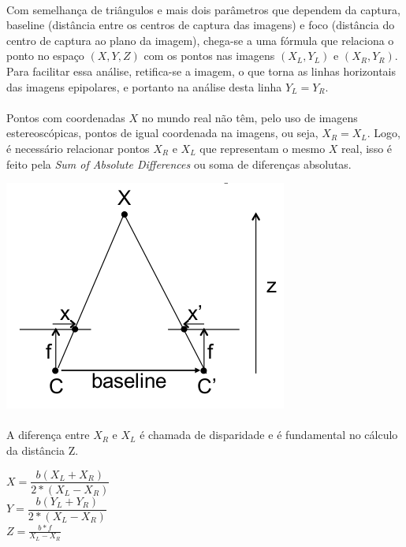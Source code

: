 \documentclass[conference, harvard, brazil, english]{sbatex}
\begin{document}
	\paragraph{} 
		Com semelhança de triângulos e mais dois parâmetros que dependem da captura, baseline (distância entre os centros de captura das imagens) e foco (distância do centro de captura ao plano da imagem), chega-se a uma fórmula que relaciona o ponto no espaço $ (X,Y,Z) $ com os pontos nas imagens $ (X_{L},Y_{L}) $ e $ (X_{R},Y_{R}) $. Para facilitar essa análise, retifica-se a imagem, o que torna as linhas horizontais das imagens epipolares, e portanto na análise desta linha $Y_{L} = Y_{R}$. 
	\paragraph{}
		Pontos com coordenadas $ X $ no mundo real não têm, pelo uso de imagens estereoscópicas, pontos de igual coordenada na imagens, ou seja, $ X_{R} = X_{L} $. Logo, é necessário relacionar pontos $ X_{R} $ e $ X_{L} $ que representam o mesmo $ X $ real, isso é feito pela \textit{Sum of Absolute Differences} ou soma de diferenças absolutas.
		\begin{center}
		\includegraphics[scale=0.5]{disparidade}
		\end{center}
	\paragraph{}
		A diferença entre $ X_{R} $ e $ X_{L} $ é chamada de disparidade e é fundamental no cálculo da distância Z.
		\begin{center}
		$ X = \dfrac{b(X_{L}+X_{R})}{2*(X_{L}-X_{R})} $\\
		$ Y = \dfrac{b(Y_{L}+Y_{R})}{2*(X_{L}-X_{R})} $\\
		$ Z = \frac{b*f}{X_{L}-X_{R}} $\\
		\end{center}
\end{document}
